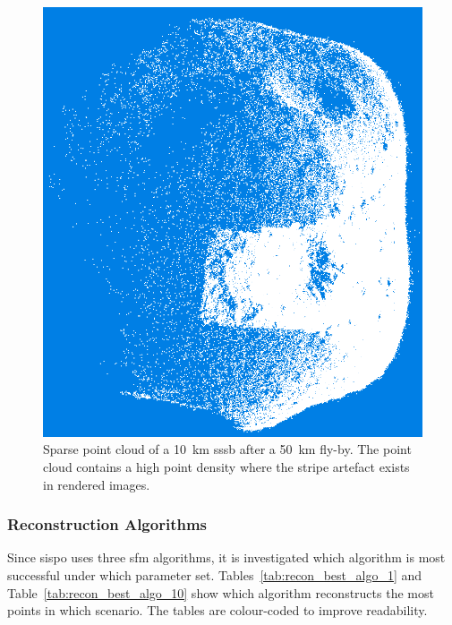\begin{figure}[htb]
    \centering
    \includegraphics[width=.6\textwidth]{doc/thesis/0_figures/models_quality/50_10/120_50_10_point1.png}
    \caption{Sparse point cloud of a \SI{10}{\kilo\meter} \gls{sssb} after a \SI{50}{\kilo\meter} fly-by. The point cloud contains a high point density where the stripe artefact exists in rendered images.}
    \label{fig:point_cloud_stripe}
\end{figure}

\subsubsection{Reconstruction Algorithms}
Since \gls{sispo} uses three \gls{sfm} algorithms, it is investigated which algorithm is most successful under which parameter set. Tables~\ref{tab:recon_best_algo_1} and Table~\ref{tab:recon_best_algo_10} show which algorithm reconstructs the most points in which scenario. The tables are colour-coded to improve readability.

